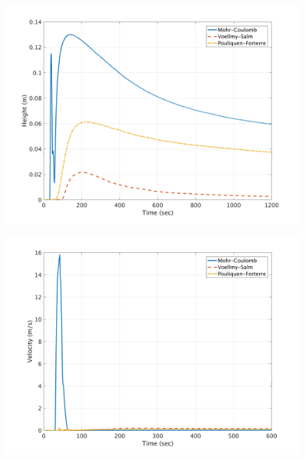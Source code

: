 \documentclass[a4paper,10pt]{article}
\begin{document}
\begin{figure}[H]
	\begin{minipage}[b]{0.5\linewidth}
	\centering
    \includegraphics[width=1\textwidth]{HeightMeans/H8All.png}     
        \label{fig:MFHR_L8}
	\end{minipage}
	\begin{minipage}[b]{0.5\linewidth}
	\centering
    \includegraphics[width=1\textwidth]{VelocityMeans/V8All.png}
        \label{fig:MFVR_L8}
	\end{minipage}
	

\end{figure}
\end{document}
